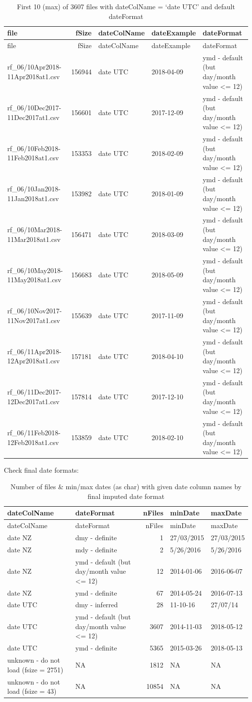 \documentclass[]{article}
\begin{document}
\begin{longtable}[]{@{}lrlll@{}}
\caption{First 10 (max) of 3607 files with dateColName = `date UTC' and
default dateFormat}\tabularnewline
\toprule
file & fSize & dateColName & dateExample & dateFormat\tabularnewline
\midrule
\endfirsthead
\toprule
file & fSize & dateColName & dateExample & dateFormat\tabularnewline
\midrule
\endhead
rf\_06/10Apr2018-11Apr2018at1.csv & 156944 & date UTC & 2018-04-09 & ymd
- default (but day/month value \textless{}= 12)\tabularnewline
rf\_06/10Dec2017-11Dec2017at1.csv & 156601 & date UTC & 2017-12-09 & ymd
- default (but day/month value \textless{}= 12)\tabularnewline
rf\_06/10Feb2018-11Feb2018at1.csv & 153353 & date UTC & 2018-02-09 & ymd
- default (but day/month value \textless{}= 12)\tabularnewline
rf\_06/10Jan2018-11Jan2018at1.csv & 153982 & date UTC & 2018-01-09 & ymd
- default (but day/month value \textless{}= 12)\tabularnewline
rf\_06/10Mar2018-11Mar2018at1.csv & 156471 & date UTC & 2018-03-09 & ymd
- default (but day/month value \textless{}= 12)\tabularnewline
rf\_06/10May2018-11May2018at1.csv & 156683 & date UTC & 2018-05-09 & ymd
- default (but day/month value \textless{}= 12)\tabularnewline
rf\_06/10Nov2017-11Nov2017at1.csv & 155639 & date UTC & 2017-11-09 & ymd
- default (but day/month value \textless{}= 12)\tabularnewline
rf\_06/11Apr2018-12Apr2018at1.csv & 157181 & date UTC & 2018-04-10 & ymd
- default (but day/month value \textless{}= 12)\tabularnewline
rf\_06/11Dec2017-12Dec2017at1.csv & 157814 & date UTC & 2017-12-10 & ymd
- default (but day/month value \textless{}= 12)\tabularnewline
rf\_06/11Feb2018-12Feb2018at1.csv & 153859 & date UTC & 2018-02-10 & ymd
- default (but day/month value \textless{}= 12)\tabularnewline
\bottomrule
\end{longtable}

Check final date formats:

\begin{longtable}[]{@{}llrll@{}}
\caption{Number of files \& min/max dates (as char) with given date
column names by final imputed date format}\tabularnewline
\toprule
dateColName & dateFormat & nFiles & minDate & maxDate\tabularnewline
\midrule
\endfirsthead
\toprule
dateColName & dateFormat & nFiles & minDate & maxDate\tabularnewline
\midrule
\endhead
date NZ & dmy - definite & 1 & 27/03/2015 & 27/03/2015\tabularnewline
date NZ & mdy - definite & 2 & 5/26/2016 & 5/26/2016\tabularnewline
date NZ & ymd - default (but day/month value \textless{}= 12) & 12 &
2014-01-06 & 2016-06-07\tabularnewline
date NZ & ymd - definite & 67 & 2014-05-24 & 2016-07-13\tabularnewline
date UTC & dmy - inferred & 28 & 11-10-16 & 27/07/14\tabularnewline
date UTC & ymd - default (but day/month value \textless{}= 12) & 3607 &
2014-11-03 & 2018-05-12\tabularnewline
date UTC & ymd - definite & 5365 & 2015-03-26 &
2018-05-13\tabularnewline
unknown - do not load (fsize = 2751) & NA & 1812 & NA &
NA\tabularnewline
unknown - do not load (fsize = 43) & NA & 10854 & NA & NA\tabularnewline
\bottomrule
\end{longtable}
\end{document}
